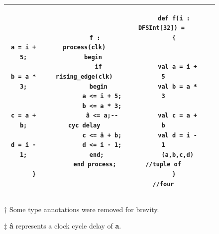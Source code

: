\begin{figure}[!t]
\begin{threeparttable}
\begin{tabular}{|c|c|c|c|c|}
\begin{minipage}[b]{0.18\linewidth}
\begin{verbatim}
      
        a = i + 5;
        b = a * 3;
      
        c = a + b;
        d = i - 1;

      }
		\end{verbatim}
	\end{minipage}
	&
	\begin{minipage}[b]{0.18\linewidth}
		\begin{verbatim}
      f : process(clk)
      begin 
        if rising_edge(clk)
        begin
          a <= i + 5;
          b <= a * 3;
          â <= a;--cyc delay
          c <= â + b;
          d <= i - 1;
        end; 
      end process;
		\end{verbatim}
	\end{minipage}
	&
	\begin{minipage}[b]{0.19\linewidth}
		\begin{verbatim}
      def f(i : DFSInt[32]) = 
      {
      
      
        val a = i + 5
        val b = a * 3
      
        val c = a + b
        val d = i - 1
        (a,b,c,d) //tuple of
      }           //four
		\end{verbatim}
	\end{minipage}
  \\
  \hline
  \end{tabular}
  \begin{tablenotes}
    \item [†] Some type annotations were removed for brevity.
    \item [‡] \textbf{â} represents a clock cycle delay of \textbf{a}.
  \end{tablenotes}
  \end{threeparttable}
\end{figure}%
